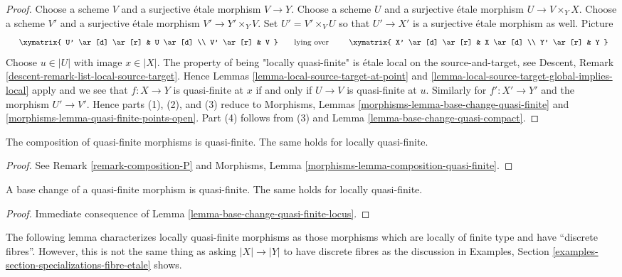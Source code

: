 \begin{proof}
Choose a scheme $V$ and a surjective \'etale morphism $V \to Y$.
Choose a scheme $U$ and a surjective \'etale morphism $U \to V \times_Y X$.
Choose a scheme $V'$ and a surjective \'etale morphism $V' \to Y' \times_Y V$.
Set $U' = V' \times_V U$ so that $U' \to X'$ is a surjective \'etale
morphism as well. Picture
$$
\vcenter{
\xymatrix{
U' \ar[d] \ar[r] & U \ar[d] \\
V' \ar[r] & V
}
}
\quad\text{lying over}\quad
\vcenter{
\xymatrix{
X' \ar[d] \ar[r] & X \ar[d] \\
Y' \ar[r] & Y
}
}
$$
Choose $u \in |U|$ with image $x \in |X|$.
The property of being "locally quasi-finite" is \'etale local on
the source-and-target, see
Descent, Remark \ref{descent-remark-list-local-source-target}.
Hence Lemmas \ref{lemma-local-source-target-at-point} and
\ref{lemma-local-source-target-global-implies-local} apply and
we see that $f : X \to Y$ is quasi-finite at $x$
if and only if $U \to V$ is quasi-finite at $u$.
Similarly for $f' : X' \to Y'$ and the morphism $U' \to V'$.
Hence parts (1), (2), and (3) reduce to
Morphisms, Lemmas \ref{morphisms-lemma-base-change-quasi-finite} and
\ref{morphisms-lemma-quasi-finite-points-open}.
Part (4) follows from (3) and Lemma \ref{lemma-base-change-quasi-compact}.
\end{proof}

\begin{lemma}
\label{lemma-composition-quasi-finite}
The composition of quasi-finite morphisms is quasi-finite.
The same holds for locally quasi-finite.
\end{lemma}

\begin{proof}
See Remark \ref{remark-composition-P} and
Morphisms, Lemma \ref{morphisms-lemma-composition-quasi-finite}.
\end{proof}

\begin{lemma}
\label{lemma-base-change-quasi-finite}
A base change of a quasi-finite morphism is quasi-finite.
The same holds for locally quasi-finite.
\end{lemma}

\begin{proof}
Immediate consequence of Lemma \ref{lemma-base-change-quasi-finite-locus}.
\end{proof}

\noindent
The following lemma characterizes locally quasi-finite morphisms as those
morphisms which are locally of finite type and have ``discrete fibres''.
However, this is not the same thing as asking $|X| \to |Y|$ to have
discrete fibres as the discussion in
Examples, Section \ref{examples-section-specializations-fibre-etale}
shows.

